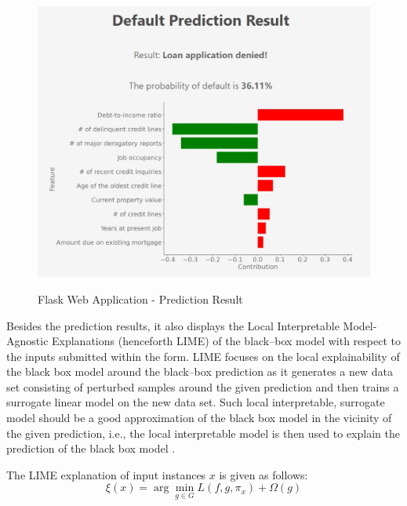 \begin{figure}[H]
\centering
\caption{Flask Web Application - Prediction Result}\vspace{0.5em}
\label{fig:flaskres}\
\includegraphics[width=130mm]{Figures/flask_app_result.jpg}

\vspace{-1em}
\end{figure}

Besides the prediction results, it also displays the Local Interpretable Model-Agnostic Explanations (henceforth LIME) of the black--box model with respect to the inputs submitted within the form.
LIME focuses on the local explainability of the black box model around the black--box prediction as it generates a new data set consisting of perturbed samples around the given prediction and then trains a surrogate linear model on the new data set.
Such local interpretable, surrogate model should be a good approximation of the black box model in the vicinity of the given prediction, i.e., the local interpretable model is then used to explain the prediction of the black box model \citep{ribeiro2016should}.

The LIME explanation of input instances $x$ is given as follows:
\begin{equation}\label{eq}
\xi(x) = \arg\min_{g \in G} L(f, g, \pi_x) + \Omega(g)
\end{equation}

